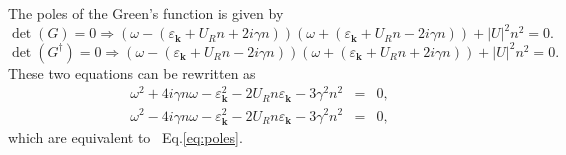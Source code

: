 \documentclass[aps,onecolumn,superscriptaddress,notitlepage,longbibliography]{revtex4-1}
\newcommand{\tmmathbf}[1]{\ensuremath{\boldsymbol{#1}}}
\begin{document}
The poles of the Green's function is given by
\begin{equation}
  \det (G) = 0 \Rightarrow (\omega - (\varepsilon_{\tmmathbf{k}} + U_R n + 2 i
  \gamma n)) (\omega + (\varepsilon_{\tmmathbf{k}} + U_R n - 2 i \gamma n)) +
  | U |^2 n^2 = 0.
\end{equation}
\begin{equation}
  \det (G^{\dagger}) = 0 \Rightarrow (\omega - (\varepsilon_{\tmmathbf{k}} +
  U_R n - 2 i \gamma n)) (\omega + (\varepsilon_{\tmmathbf{k}} + U_R n + 2 i
  \gamma n)) + | U |^2 n^2 = 0.
\end{equation}
These two equations can be rewritten as
\begin{eqnarray}
  \omega^2 + 4 i \gamma n \omega - \varepsilon_{\tmmathbf{k}}^2 - 2 U_R n
  \varepsilon_{\tmmathbf{k}} - 3 \gamma^2 n^2 & = & 0, \\
  \omega^2 - 4 i \gamma n \omega - \varepsilon_{\tmmathbf{k}}^2 - 2 U_R n
  \varepsilon_{\tmmathbf{k}} - 3 \gamma^2 n^2 & = & 0, 
\end{eqnarray}
which are equivalent to \ Eq.\eqref{eq:poles}.
\end{document}
